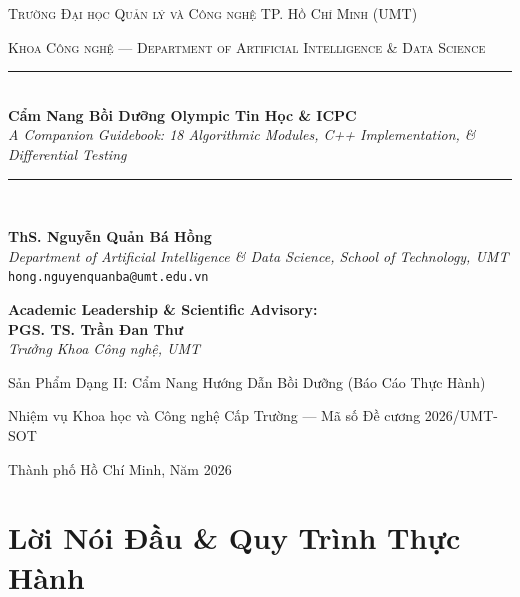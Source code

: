 \documentclass[11pt, letterpaper]{report}
\begin{document}
\hypersetup{pageanchor=false}
\begin{titlepage}
	\centering
	\vspace*{0.5cm}
	{\scshape\Large Trường Đại học Quản lý và Công nghệ TP. Hồ Chí Minh (UMT)\par}
	{\scshape\large Khoa Công nghệ --- Department of Artificial Intelligence \& Data Science\par}
	\vspace{1.2cm}
	\rule{\linewidth}{0.8pt} \\
	\vspace{0.4cm}
	{\Huge \textbf{Cẩm Nang Bồi Dưỡng Olympic Tin Học \& ICPC}} \\
	\vspace{0.3cm}
	{\Large \textit{A Companion Guidebook: 18 Algorithmic Modules, C++ Implementation, \& Differential Testing}} \\
	\vspace{0.3cm}
	\rule{\linewidth}{0.8pt} \\
	\vspace{1.2cm}
	
	\textbf{\Large ThS. Nguyễn Quản Bá Hồng} \\
	\vspace{0.2cm}
	\textit{Department of Artificial Intelligence \& Data Science, School of Technology, UMT} \\
	\texttt{hong.nguyenquanba@umt.edu.vn} \\
	\vspace{1.2cm}
	
	\textbf{Academic Leadership \& Scientific Advisory:} \\
	\textbf{PGS. TS. Trần Đan Thư} \\
	\textit{Trưởng Khoa Công nghệ, UMT} \\
	\vfill
	
	{\large Sản Phẩm Dạng II: Cẩm Nang Hướng Dẫn Bồi Dưỡng (Báo Cáo Thực Hành)\par}
	{\small Nhiệm vụ Khoa học và Công nghệ Cấp Trường --- Mã số Đề cương 2026/UMT-SOT\par}
	\vspace{0.4cm}
	{\large Thành phố Hồ Chí Minh, Năm 2026\par}
\end{titlepage}
\hypersetup{pageanchor=true}

\chapter*{Lời Nói Đầu \& Quy Trình Thực Hành}
\label{chap:intro}
\end{document}
